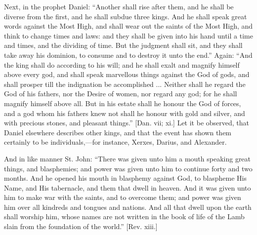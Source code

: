 Next, in the prophet Daniel: ``Another shall rise after them,
and he shall be diverse from the first, and he shall subdue three
kings. And he shall speak great words against the Most High, and shall
wear out the saints of the Most High, and think to change times and
laws: and they shall be given into his hand until a time and times,
and the dividing of time. But the judgment shall sit, and they shall
take away his dominion, to consume and to destroy it unto the
end.'' Again: ``And the king shall do according to his will;
and he shall exalt and magnify himself above every god, and shall
speak marvellous things against the God of gods, and shall prosper
till the indignation be accomplished ... Neither shall he regard the
God of his fathers, nor the Desire of women, nor regard any god; for
he shall magnify himself above all. But in his estate shall he honour
the God of forces, and a god whom his fathers knew not shall he honour
with gold and silver, and with precious stones, and pleasant
things.'' [Dan. vii; xi.] Let it be observed, that Daniel
elsewhere describes other kings, and that the event has shown them
certainly to be individuals,—for instance, Xerxes, Darius, and
Alexander.

And in like manner St. John: ``There was given unto him a mouth
speaking great things, and blasphemies; and power was given unto him
to continue forty and two months. And he opened his mouth in blasphemy
against God, to blaspheme His Name, and His tabernacle, and them that
dwell in heaven. And it was given unto him to make war with the
saints, and to overcome them; and power was given him over all
kindreds and tongues and nations. And all that dwell upon the earth
shall worship him, whose names are not written in the book of life of
the Lamb slain from the foundation of the world.'' [Rev. xiii.]

